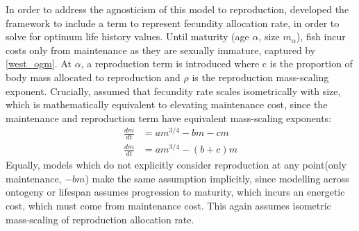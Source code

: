 \documentclass[a4paper]{article} %
\begin{document}
In order to address the agnosticism of this model to reproduction, \cite{Charnov2001} developed the framework to include a term to represent fecundity allocation rate, in order to solve for optimum life history values. Until maturity (age $\alpha$, size $m_{\alpha}$), fish incur costs only from maintenance as they are sexually immature, captured by \cref{west_ogm}. At $\alpha$, a reproduction term is introduced where c is the proportion of body mass allocated to reproduction and $\rho$ is the reproduction mass-scaling exponent. Crucially, \cite{Charnov2001} assumed that fecundity rate scales isometrically with size, which is mathematically equivalent to elevating maintenance cost, since the maintenance and reproduction term have equivalent mass-scaling exponents:
\begin{align}
    \frac{dm}{dt} &= am^{3/4} - bm - cm \nonumber \\
    \frac{dm}{dt} &= am^{3/4} - (b+c)m \label{charnov}
\end{align}
Equally, models which do not explicitly consider reproduction at any point(only maintenance, $-bm$) make the same assumption implicitly, since modelling across ontogeny or lifespan assumes progression to maturity, which incurs an energetic cost, which must come from maintenance cost. This again assumes isometric mass-scaling of reproduction allocation rate.
\end{document}
